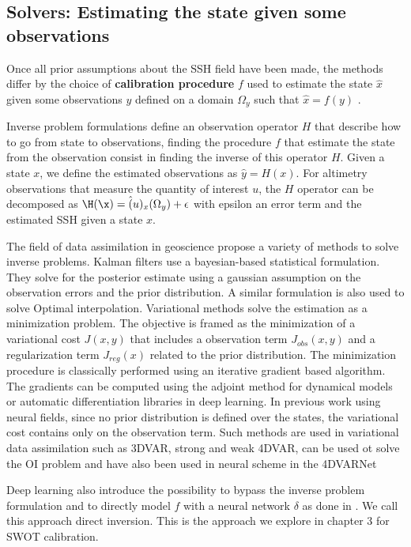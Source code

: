 \begin{bibunit}
\section{Solvers: Estimating the state given some observations}

Once all prior assumptions about the SSH field have been made, the methods differ by the choice of \textbf{calibration procedure}  $f$ used to estimate the state $\hat{x}$ given some observations $y$ defined on a domain $\Omega_y$ such that $\hat{x}=f(y)$ .

Inverse problem formulations define an observation operator $H$ that describe how to go from state to observations, finding the procedure $f$ that estimate the state from the observation consist in finding the inverse of this operator $H$.
Given a state $x$, we define the estimated observations as $\hat{y} = H(x)$. For altimetry observations that measure the quantity of interest $u$, the $H$ operator can be decomposed as $\H(\x) = \hat(u)_x(\Omega_y) + \epsilon$ with epsilon an error term and  the estimated SSH given a state $x$.


The field of data assimilation in geoscience propose a variety of methods to solve inverse problems.
Kalman filters use a bayesian-based statistical formulation. They solve for the posterior estimate using a gaussian assumption on the observation errors and the prior distribution. A similar formulation is also used to solve Optimal interpolation.
Variational methods solve the estimation as a minimization problem. The objective is framed as the minimization of a variational cost $J(x, y)$ that includes a observation term $J_{obs}(x, y)$ and a regularization term  $J_{reg}(x)$ related to the prior distribution.
The minimization procedure is classically performed using an iterative gradient based algorithm\cite{}. The gradients can be computed using the adjoint method for dynamical models or automatic differentiation libraries in deep learning\cite{}.
In previous work using neural fields, since no prior distribution is defined over the states, the variational cost contains only on the observation term.
Such methods are used in variational data assimilation such as 3DVAR, strong and weak 4DVAR, can be used ot solve the OI problem and have also been used in neural scheme in the 4DVARNet


Deep learning also introduce the possibility to bypass the inverse problem formulation and to directly model $f$ with a neural network $\delta$ as done in \cite{}. We call this approach direct inversion. This is the approach we explore in chapter 3 for SWOT calibration.




\end{bibunit}
